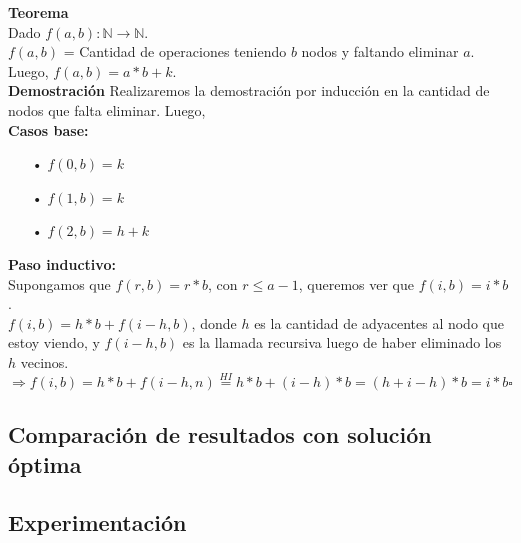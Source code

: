 \textbf{Teorema}\\
Dado $f(a,b): \mathbb{N} \rightarrow \mathbb{N}$.\\
$f(a,b)$ = Cantidad de operaciones teniendo $b$ nodos y faltando eliminar $a$.\\
Luego, $f(a,b) = a*b + k$.\\

\textbf{Demostración}
Realizaremos la demostración por inducción en la cantidad de nodos que falta eliminar.
Luego,\\
\textbf{Casos base:}
\begin{itemize}
	\item[•] $f(0,b) = k$ 
    \item[•] $f(1,b) = k$ 
    \item[•] $f(2,b) = h + k$     
\end{itemize}
\textbf{Paso inductivo:}\\
Supongamos que $f(r,b) = r*b$, con $r \leq a-1$, queremos ver que $f(i,b) = i*b$.\\
$f(i,b) = h*b + f(i-h,b)$, donde $h$ es la cantidad de adyacentes al nodo que estoy viendo, y $f(i-h,b)$ es la llamada recursiva luego de haber eliminado los $h$ vecinos.\\
$\Rightarrow f(i,b) = h*b + f(i-h,n) \stackrel{HI}{=} h*b + (i-h)*b = (h + i -h)*b = i*b \square$


\subsection{Comparaci\'on de resultados con soluci\'on \'optima}
\subsection{Experimentaci\'on}
